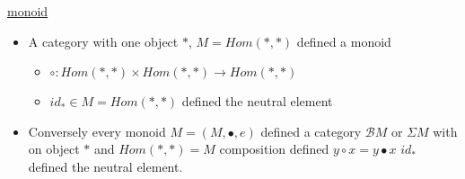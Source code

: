 \documentclass{article}
\theoremstyle{plain}
\begin{document}
    \ex \underline{monoid}
    \begin{itemize}
      \item A category with one object $*$, $M = Hom(*, *)$ defined a monoid

        \begin{itemize}
          \item $\circ : Hom(*, *) \times Hom(*,*) \to Hom(*, *)$
          \item $id_* \in M = Hom(*, *)$ defined the neutral element
        \end{itemize}
      \item Conversely every monoid $M = (M, \bullet, e)$ defined a category
        $\mathcal B M$ or $\Sigma M$ with on object $*$ and $Hom(*, *) = M$
        composition defined $y \circ x = y \bullet x$ $id_*$ defined the neutral
        element.

      \begin{center}
      \end{center}
    \end{itemize}
\end{document}
